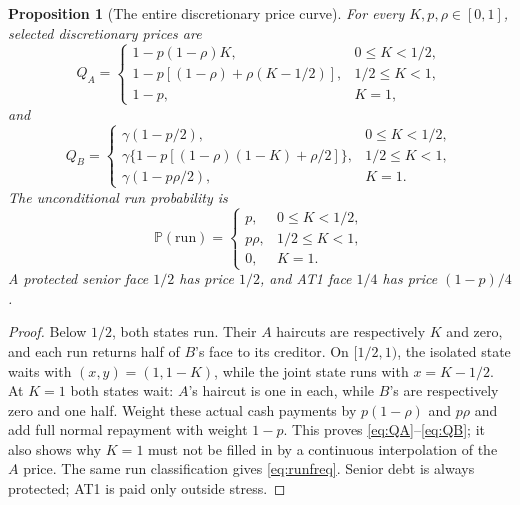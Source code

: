 \documentclass[11pt,a4paper]{article}
\numberwithin{equation}{section}
\newtheorem{proposition}[theorem]{Proposition}
\theoremstyle{definition}
\newcommand{\Prb}{\mathbb P}
\begin{document}
\begin{proposition}[The entire discretionary price curve]\label{prop:prices}
For every \(K,p,\rho\in[0,1]\), selected discretionary prices are
\begin{equation}\label{eq:QA}
Q_A=
\begin{cases}
1-p(1-\rho)K,&0\le K<1/2,\\
1-p[(1-\rho)+\rho(K-1/2)],&1/2\le K<1,\\
1-p,&K=1,
\end{cases}
\end{equation}
and
\begin{equation}\label{eq:QB}
Q_B=
\begin{cases}
\gamma(1-p/2),&0\le K<1/2,\\
\gamma\{1-p[(1-\rho)(1-K)+\rho/2]\},&1/2\le K<1,\\
\gamma(1-p\rho/2),&K=1 .
\end{cases}
\end{equation}
The unconditional run probability is
\begin{equation}\label{eq:runfreq}
\Prb(\mathrm{run})=
\begin{cases}
p,&0\le K<1/2,\\
p\rho,&1/2\le K<1,\\
0,&K=1.
\end{cases}
\end{equation}
A protected senior face \(1/2\) has price \(1/2\), and AT1 face \(1/4\)
has price \((1-p)/4\).
\end{proposition}
\begin{proof}
Below \(1/2\), both states run. Their \(A\) haircuts are respectively
\(K\) and zero, and each run returns half of \(B\)'s face to its
creditor. On \([1/2,1)\), the isolated state waits with
\((x,y)=(1,1-K)\), while the joint state runs with
\(x=K-1/2\). At \(K=1\) both states wait: \(A\)'s haircut is one
in each, while \(B\)'s are respectively zero and one half.
Weight these actual cash payments by \(p(1-\rho)\) and \(p\rho\)
and add full normal repayment with weight \(1-p\). This proves
\eqref{eq:QA}--\eqref{eq:QB}; it also shows why \(K=1\) must not
be filled in by a continuous interpolation of the \(A\) price.
The same run classification gives \eqref{eq:runfreq}. Senior debt
is always protected; AT1 is paid only outside stress.
\end{proof}
\end{document}
